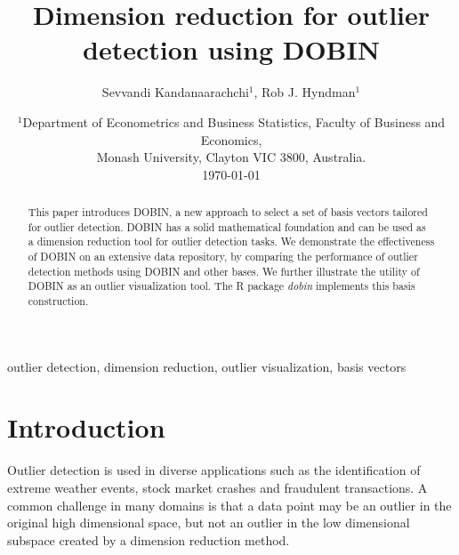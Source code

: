 \documentclass[a4paper,12pt]{article}
\begin{document}

\title{Dimension reduction for outlier detection using DOBIN}
\author{Sevvandi Kandanaarachchi$^1$, Rob J. Hyndman$^1$}
\date{%
   \scriptsize{ $^1$Department of Econometrics and Business Statistics, Faculty of Business and Economics, \\ Monash University, Clayton VIC 3800, Australia.\\ [2ex]}%
    \today \\
}
\begin{titlingpage}
\maketitle 

\begin{abstract}
	This paper introduces DOBIN, a new approach to select a set of basis vectors tailored for outlier detection. DOBIN has a solid mathematical foundation and can be used as a dimension reduction tool for outlier detection tasks. We demonstrate the effectiveness of DOBIN on an extensive data repository, by comparing the performance of outlier detection methods using DOBIN and other bases. We further illustrate the utility of DOBIN as an outlier visualization tool. The R package \textit{dobin} implements this basis construction.
\end{abstract}

\begin{keywords}outlier detection, dimension reduction, outlier visualization, basis vectors
\end{keywords}

\end{titlingpage}

\section{Introduction}

Outlier detection is used in diverse applications such as the identification of extreme weather events, stock market crashes and fraudulent transactions. A common challenge in many domains is that a data point may be an outlier in the original high dimensional space, but not an outlier in the low dimensional subspace created by a dimension reduction method.
\end{document}
